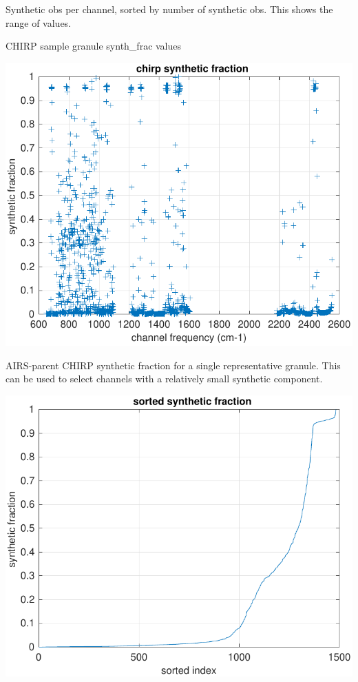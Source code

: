 \documentclass[12pt]{article}
\begin{document}
Synthetic obs per channel, sorted by number of synthetic obs.  This
shows the range of values.

CHIRP sample granule synth\_frac values

  \begin{centering}
  \includegraphics[width=\textwidth]{figures/chirp_sample_syn_frac.pdf}
  \end{centering}\vspace{3mm}

AIRS-parent CHIRP synthetic fraction for a single representative
granule.  This can be used to select channels with a relatively small
synthetic component.

  \begin{centering}
  \includegraphics[width=\textwidth]{figures/chirp_sorted_syn_frac.pdf}
  \end{centering}\vspace{3mm}
\end{document}
